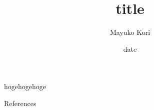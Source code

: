 \documentclass[unicode,12pt]{beamer}
\title{title}
\author{Mayuko Kori}
\date{date}
\begin{document}
\maketitle

\begin{frame}{}
hogehogehoge
\end{frame}

\begin{frame}[allowframebreaks]{References}
  \nocite{*}
  \printbibliography[heading=none]
\end{frame}
\end{document}
